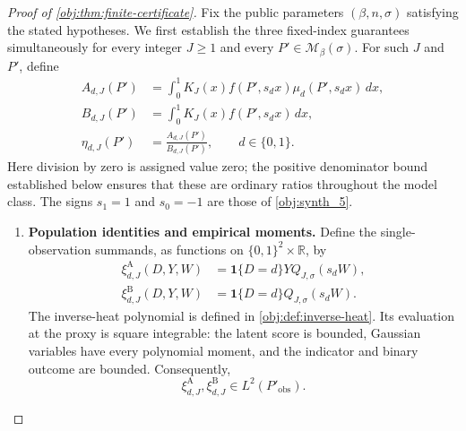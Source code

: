 \documentclass[11pt]{article}
\begin{document}
\begin{proof}[Proof of \cref{obj:thm:finite-certificate}]
Fix the public parameters \((\beta,n,\sigma)\) satisfying the stated hypotheses. We first establish the three fixed-index guarantees simultaneously for every integer \(J\ge1\) and every \(P'\in\mathcal M_\beta(\sigma)\). For such \(J\) and \(P'\), define
\[
\begin{aligned}
A_{d,J}(P')
&=\int_0^1 K_J(x)f(P',s_dx)\mu_d(P',s_dx)\,dx,\\
B_{d,J}(P')
&=\int_0^1 K_J(x)f(P',s_dx)\,dx,\\
\eta_{d,J}(P')
&=\frac{A_{d,J}(P')}{B_{d,J}(P')},
\qquad d\in\{0,1\}.
\end{aligned}
\]
Here division by zero is assigned value zero; the positive denominator bound established below ensures that these are ordinary ratios throughout the model class. The signs \(s_1=1\) and \(s_0=-1\) are those of \cref{obj:synth_5}.

\begin{enumerate}
\item \textbf{Population identities and empirical moments.}
Define the single-observation summands, as functions on
\(\{0,1\}^2\times\mathbb R\), by
\[
\begin{aligned}
\xi^{\mathrm A}_{d,J}(D,Y,W)
&=\mathbf1\{D=d\}YQ_{J,\sigma}(s_dW),\\
\xi^{\mathrm B}_{d,J}(D,Y,W)
&=\mathbf1\{D=d\}Q_{J,\sigma}(s_dW).
\end{aligned}
\]
The inverse-heat polynomial is defined in \cref{obj:def:inverse-heat}.
Its evaluation at the proxy is square integrable: the latent score is bounded, Gaussian variables have every polynomial moment, and the indicator and binary outcome are bounded. Consequently,
\[
\xi^{\mathrm A}_{d,J},\xi^{\mathrm B}_{d,J}
\in L^2(P'_{\mathrm{obs}}).
\]


\end{enumerate}
\end{proof}
\end{document}
